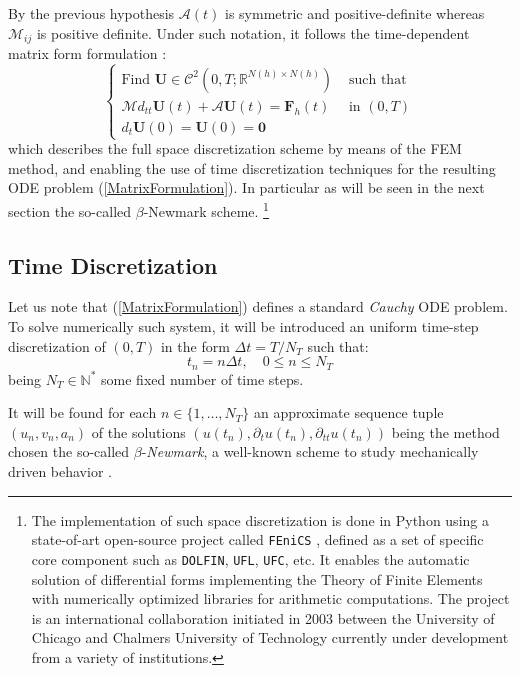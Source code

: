 By the previous hypothesis $\mathcal{A}(t)$ is symmetric and positive-definite whereas $\mathcal{M}_{ij}$ is positive definite. Under such notation, it follows the time-dependent matrix form formulation :
\begin{equation}
    \label{MatrixFormulation}
    \left \{
    \begin{array}{cc}
        \text{Find } \mathbf{U} \in \mathcal{C}^2(0,T; \mathbb{R}^{N(h)\times N(h)}) & \text{ such that} \\
        \mathcal{M} d_{tt} \mathbf{U}(t) + \mathcal{A}\mathbf{U}(t) = \mathbf{F}_h (t) & \text{ in }(0,T)\\ 
        d_{t} \mathbf{U}(0) = \mathbf{U}(0)  = \mathbf{0}&
    \end{array}
    \right.
\end{equation}
which describes the full space discretization scheme by means of the FEM method, and enabling the use of time discretization techniques for the resulting ODE problem (\ref{MatrixFormulation}). In particular as will be seen in the next section the so-called $\beta$-Newmark scheme. \footnote{The implementation of such space discretization is done in Python using a state-of-art open-source project called \texttt{FEniCS} \cite{logg2012automated}, defined as a set of specific core component such as \texttt{DOLFIN}, \texttt{UFL},  \texttt{UFC}, etc. It enables the automatic solution of differential forms implementing the Theory of Finite Elements with numerically optimized libraries for arithmetic computations. The project is an international collaboration initiated in 2003 between the University of Chicago and Chalmers University of Technology currently under development from a variety of institutions.}

\subsection{Time Discretization}
Let us note that (\ref{MatrixFormulation}) defines a standard \textit{Cauchy} ODE problem. To solve numerically such system, it will be introduced an uniform time-step discretization of $(0,T)$ in the form $\Delta t = T/N_T$ such that:
\begin{equation*}
    t_n = n \Delta t, \quad 0 \leq n \leq N_T
\end{equation*}
being $N_T \in \mathbb{N}^*$ some fixed number of time steps.

It will be found for each $n \in \{1,\dots, N_T \}$ an approximate sequence tuple $(u_n, v_n, a_n)$ of the solutions $(u(t_n), \partial_{t} u(t_n), \partial_{tt} u(t_n))$ being the method chosen the so-called $\beta$-\textit{Newmark}, a well-known scheme to study mechanically driven behavior \cite{raviart1983introduction}.

